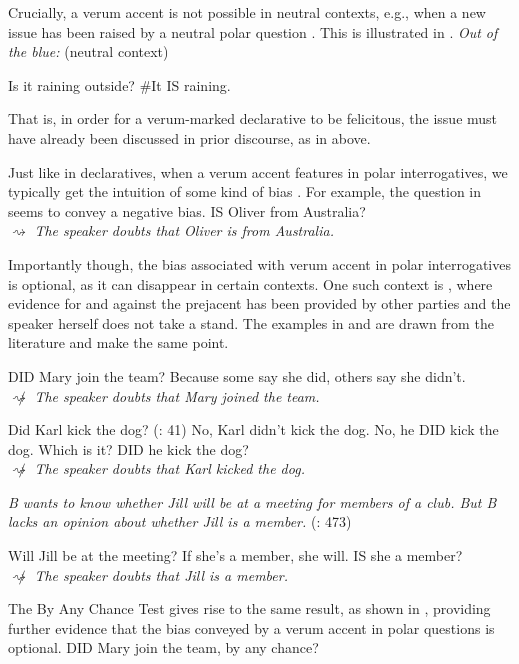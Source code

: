 \documentclass[output=paper,colorlinks,citecolor=brown]{langscibook}
\begin{document}
Crucially, a verum accent is not possible in neutral contexts, e.g., when a new issue has been raised by a neutral polar question \citep{Wilder2013, Samko2016, Goodhue2018a, Gutzmann2020}. This is illustrated in . 
\is{}
\ea \textit{Out of the blue:}         \hfill (neutral context)\label{Vrm.Neu.Eg}
    \begin{xlist}
     Is it raining outside? 
	 \#It IS raining.   
    \end{xlist}
\z
\il{}
That is, in order for a verum-marked declarative to be felicitous, the issue must have already been discussed in prior discourse, as in  above.

Just like in declaratives, when a verum accent features in polar interrogatives, we typically get the intuition of some kind of bias \citep{romero2004}. For example, the question in  seems to convey a negative bias.
\is{}
\ea IS Oliver from Australia?\label{Vrm.Q} \\
    $\rightsquigarrow$ \textit{The speaker doubts that Oliver is from Australia.} 
\z
\il{}

Importantly though, the bias associated with verum accent in polar interrogatives is optional, as it can disappear in certain contexts. One such context is , where evidence for and against the prejacent has been provided by other parties and the speaker herself does not take a stand. The examples in  and  are drawn from the literature and make the same point.    

\is{}
\ea DID Mary join the team? Because some say she did, others say she didn't. \\
	$\not \rightsquigarrow$ \textit{The speaker doubts that Mary joined the team.}\label{Vrm.Q.Opt1} 

\ex \label{Vrm.Q.Opt2}
    \begin{xlist}
	     Did Karl kick the dog?                 \hfill (\citealt{Gutzmann2020}: 41)
	     No, Karl didn't kick the dog.
	     No, he DID kick the dog.
	     Which is it? DID he kick the dog?  \\
	$\not \rightsquigarrow$ \textit{The speaker doubts that Karl kicked the dog.}
	\end{xlist} 
	
\ex \textit{B wants to know whether Jill will be at a meeting for members of a club. But B lacks an opinion about whether Jill is a member.}\label{Vrm.Q.Opt3} \hfill (\citealt{Goodhue2019}: 473)
    \begin{xlist}
	     Will Jill be at the meeting?                 
    	 If she's a member, she will.
	     IS she a member?   \\
	$\not \rightsquigarrow$ \textit{The speaker doubts that Jill is a member. }
	\end{xlist}
\z
\il{}
The By Any Chance Test gives rise to the same result, as shown in , providing further evidence that the bias conveyed by a verum accent in polar questions is optional.   
\is{}
\ea DID Mary join the team, by any chance?\label{Vrm.Q.Opt4}
\z
\il{}
\end{document}
